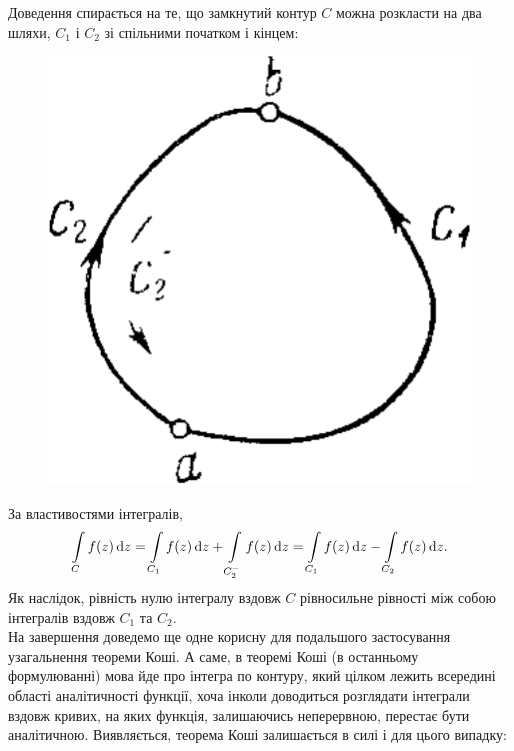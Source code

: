 Доведення спирається на те, що замкнутий контур $C$ можна розкласти на два шляхи, $C_1$ і $C_2$ зі спільними початком і кінцем:
\begin{figure}[H]
	\centering
	\includegraphics[width=.4\linewidth]{mal-18.png}
\end{figure}

За властивостями інтегралів,
\begin{equation}
	\label{eq:4.2.15}
	\displaystyle\int\limits_C f(z) \mathop{}\!\mathrm{d} z = \displaystyle\int\limits_{C_1} f(z) \mathop{}\!\mathrm{d} z + \displaystyle\int\limits_{C_2^-} f(z) \mathop{}\!\mathrm{d} z = \displaystyle\int\limits_{C_1} f(z) \mathop{}\!\mathrm{d} z - \displaystyle\int\limits_{C_2} f(z) \mathop{}\!\mathrm{d} z.
\end{equation}
Як наслідок, рівність нулю інтегралу вздовж $C$ рівносильне рівності між собою інтегралів вздовж $C_1$ та $C_2$. \\

На завершення доведемо ще одне корисну для подальшого застосування узагальнення теореми Коші. А саме, в теоремі Коші (в останньому формулюванні) мова йде про інтегра по контуру, який цілком лежить всередині області аналітичності функції, хоча інколи доводиться розглядати інтеграли вздовж кривих, на яких функція, залишаючись неперервною, перестає бути аналітичною. Виявляється, теорема Коші залишається в силі і для цього випадку:

